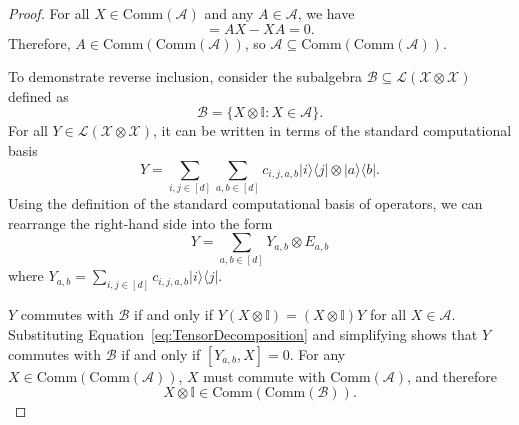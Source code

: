 \begin{proof}
For all $X \in \text{Comm}(\mathcal{A})$ and any $A \in \mathcal{A}$, we have
\begin{equation}
    [X, A] = AX - XA = 0.
\end{equation}
Therefore, $A \in \text{Comm}(\text{Comm}(\mathcal{A}))$, so $\mathcal{A} \subseteq \text{Comm}(\text{Comm} (\mathcal{A}))$.

To demonstrate reverse inclusion, consider the subalgebra $\mathcal{B} \subseteq \mathcal{L}(\mathcal{X} \otimes \mathcal{X})$ defined as
\begin{equation}
    \mathcal{B} = \{X \otimes \mathbb{I} : X \in \mathcal{A} \}.
\end{equation}
For all $Y \in \mathcal{L}(\mathcal{X} \otimes \mathcal{X})$, it can be written in terms of the standard computational basis
\begin{equation}
    Y = \sum_{i, j \in [d]} \sum_{a, b \in [d]} c_{i, j, a, b} |i \rangle \langle j| \otimes |a \rangle \langle b|.
\end{equation}
Using the definition of the standard computational basis of operators, we can rearrange the right-hand side into the form
\begin{equation}\label{eq:TensorDecomposition}
    Y = \sum_{a, b \in [d]} Y_{a, b} \otimes E_{a, b}
\end{equation}
where $Y_{a, b} = \sum_{i, j \in [d]} c_{i, j, a, b} |i \rangle \langle j |$.

$Y$ commutes with $\mathcal{B}$ if and only if $Y(X \otimes \mathbb{I}) = (X \otimes \mathbb{I}) Y$ for all $X \in \mathcal{A}$.
Substituting Equation~\ref{eq:TensorDecomposition} and simplifying shows that $Y$ commutes with $\mathcal{B}$ if and only if $[Y_{a, b}, X] = 0$.
For any $X \in \text{Comm}(\text{Comm}(\mathcal{A}))$, $X$ must commute with $\text{Comm}(\mathcal{A})$, and therefore
\begin{equation}\label{eq:ccAImpliesccB}
    X \otimes \mathbb{I} \in \text{Comm}(\text{Comm}(\mathcal{B})).
\end{equation}


\end{proof}

